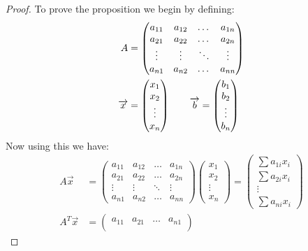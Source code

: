 \documentclass[12pt, letterpaper, onecolumn, conference, final]{IEEEtran}
\theoremstyle{definition}
\theoremstyle{plain}
\begin{document}
\begin{proof}
To prove the proposition we begin by defining:
\begin{equation*}
\begin{split}
A &= \begin{pmatrix}
a_{11} & a_{12} & \dots & a_{1n} \\
a_{21} & a_{22} & \dots & a_{2n} \\
\vdots & \vdots & \ddots & \vdots \\
a_{n1} & a_{n2} & \dots & a_{nn}
\end{pmatrix} \\
\overrightarrow{x} &= \begin{pmatrix}
x_1 \\
x_2 \\
\vdots \\
x_n
\end{pmatrix} \hspace{.7cm} \overrightarrow{b} = \begin{pmatrix}
b_1 \\
b_2 \\
\vdots \\
b_n
\end{pmatrix}
\end{split}
\end{equation*}
\noindent
Now using this we have:
\begin{equation*}
\begin{split}
A\overrightarrow{x} &= \begin{pmatrix}
a_{11} & a_{12} & \dots & a_{1n} \\
a_{21} & a_{22} & \dots & a_{2n} \\
\vdots & \vdots & \ddots & \vdots \\
a_{n1} & a_{n2} & \dots & a_{nn}
\end{pmatrix} \begin{pmatrix}
x_1 \\
x_2 \\
\vdots \\
x_n
\end{pmatrix} = \begin{pmatrix}
\sum a_{1i}x_i \\
\sum a_{2i}x_i \\
\vdots \\
\sum a_{ni}x_i
\end{pmatrix} \\
A^T\overrightarrow{x} &= \begin{pmatrix}
a_{11} & a_{21} & \dots & a_{n1} \\

\end{pmatrix}
\end{split}
\end{equation*}
\end{proof}
\end{document}
